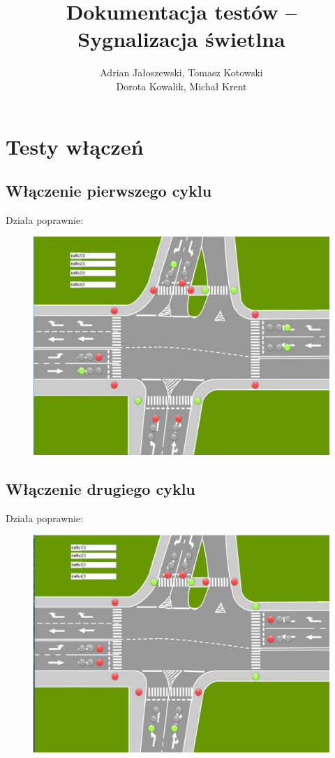 \documentclass[a4paper, 12pt, titlepage]{article}
\title{Dokumentacja testów -- Sygnalizacja świetlna}
\author{Adrian Jałoszewski, Tomasz Kotowski \\ Dorota Kowalik, Michał Krent}
\date{}
\begin{document}
	\maketitle
	\tableofcontents
	\newpage
	\section{Testy włączeń}
		\subsection{Włączenie pierwszego cyklu}
			Działa poprawnie:
			\begin{figure}[H]
				\centering
				\includegraphics[height=0.4\textheight]{./img/pierwszy.png}
			\end{figure}
		\subsection{Włączenie drugiego cyklu}
			Działa poprawnie:
			\begin{figure}[H]
				\centering
				\includegraphics[height=0.35\textheight]{./img/drugi.png}
			\end{figure}
\end{document}
